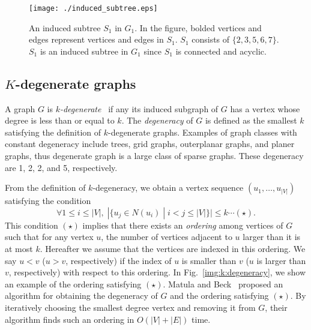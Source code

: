 \documentclass{llncs}
\newcommand{\name}[1]{\textit{#1}}
\newcommand{\set}[1]{\{#1\}}
\newcommand{\inset}[2]{\{#1\;|\;#2\}}
\begin{document}
\begin{figure}[t]
    \begin{center}
        \texttt{[image: ./induced\_subtree.eps]}
        \caption{
            An induced subtree $S_1$ in $G_1$. 
            In the figure, bolded vertices and edges represent vertices and edges in $S_1$. 
            $S_1$ consists of $\set{2, 3, 5, 6, 7}$. 
            $S_1$ is an induced subtree in $G_1$ since $S_1$ is connected and acyclic. 
        }
        \label{img:induced:subtree}
    \end{center}
\end{figure}






\subsection{$K$-degenerate graphs}

A graph $G$ is \name{$k$-degenerate}~\cite{Lick:White:CJM:1970}
if any its induced subgraph of $G$ has 
a vertex whose degree is less than or equal to $k$. 
The \name{degeneracy} of $G$ is defined 
as the smallest $k$ satisfying the definition of $k$-degenerate graphs. 
Examples of graph classes with constant degeneracy include 
trees, grid graphs, outerplanar graphs, and planer graphs, 
thus degenerate graph is a large class of sparse graphs. 
These degeneracy are 1, 2, 2, and 5, respectively. 

From the definition of $k$-degeneracy, 
we obtain a vertex sequence $(u_1, \dots, u_{|V|})$ 
satisfying the condition    
\begin{equation*}
\forall 1\le i\le |V|,\; |\inset{u_j \in N(u_i)}{i < j \le |V|}| \le k \cdots (\star).  
\end{equation*}
This condition $(\star)$ implies that 
there exists an \name{ordering} among vertices of $G$ 
such that for any vertex $u$, 
the number of vertices adjacent to $u$ larger than it is at most $k$. 
Hereafter we assume that the vertices 
are indexed in this ordering. 
We say $u<v$ ($u>v$, respectively) 
if the index of $u$ is smaller than $v$ ($u$ is larger than $v$, respectively) with respect to this ordering. 
In Fig.~\ref{img:k:degeneracy}, 
we show an example of the ordering
satisfying $(\star)$. 
Matula and Beck~\cite{Matula:Beck:1983} proposed 
an algorithm for obtaining the degeneracy of $G$ and the ordering satisfying $(\star)$. 
By iteratively choosing the smallest degree vertex and removing it from $G$,  
their algorithm finds such an ordering in $O(|V| + |E|)$ time. 
\end{document}
